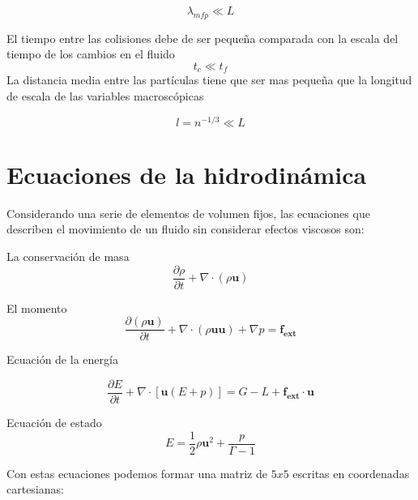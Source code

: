 \documentclass[12pt,a4paper]{book}
\begin{document}
\begin{equation}
\lambda_{mfp} \ll L
\end{equation}

El tiempo entre las colisiones debe de ser pequeña comparada con la escala del tiempo de los cambios en el fluido
\begin{equation}
t_{c} \ll t_f
\end{equation}
La distancia media entre las partículas tiene que ser mas pequeña que la longitud de escala de las variables macroscópicas

\begin{equation}
l = n^{-1/3} \ll L
\end{equation}



\section{Ecuaciones de la hidrodinámica}

Considerando una serie de elementos de volumen fijos, las ecuaciones que describen el movimiento de un fluido sin considerar efectos viscosos son:

La conservación de masa
\begin{equation} \label{conservación_masa_hidrodinamica}
\dfrac{\partial \rho }{\partial t} + \nabla \cdot \left( \rho \mathbf{u} \right)
\end{equation}

El momento
\begin{equation}  \label{conservacion_momento_hidrodinamica}
\dfrac{\partial \left( \rho \mathbf{u} \right) }{\partial t}+ \nabla \cdot \left( \rho \mathbf{u u} \right) + \nabla p = \mathbf{f_{ext}}
\end{equation}

Ecuación de la energía

\begin{equation} \label{conservacion_energia_hidrodinamica}
\dfrac{\partial E }{\partial t} + \nabla \cdot \left[ \mathbf{u} \left( E+p \right) \right] =G-L+\mathbf{f_{ext} \cdot \mathbf{u}}
\end{equation}

Ecuación de estado
\begin{equation}
E=\frac{1}{2} \rho \mathbf{u}^{2} + \frac{p}{\Gamma - 1}
\end{equation}

Con estas ecuaciones podemos formar una matriz de $5x5$ escritas en coordenadas cartesianas:
\end{document}
